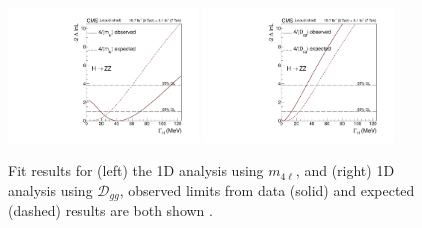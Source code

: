 \begin{figure}
\begin{center}
\caption[Fit results for (left) the 1D analysis using $m_{4\ell}$, and (right) 1D analysis using $\mathcal{D}_{gg}$, observed limits from data (solid) and expected (dashed) results are both shown.]{Fit results for (left) the 1D analysis using $m_{4\ell}$, and (right) 1D analysis using $\mathcal{D}_{gg}$, observed limits from data (solid) and expected (dashed) results are both shown \cite{Khachatryan:2014iha}.
\label{fig:1D_width}}
\includegraphics[width=0.45\textwidth]{HZZ_Width/1Dm4lFitPaper_30_04_14_MeV.pdf}
\includegraphics[width=0.45\textwidth]{HZZ_Width/1DDggFitPaper_30_04_14_MeV.pdf}
\end{center}
\end{figure}

